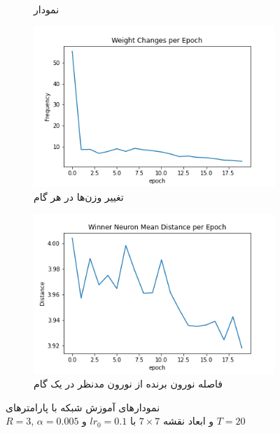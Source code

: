 \documentclass[12pt, a4paper]{article}
\begin{document}
\begin{figure}[h]
\begin{subfigure}{0.45\linewidth}
        \caption{نمودار }
    \end{subfigure}
    \newline
    \begin{subfigure}{0.45\linewidth}
        \includegraphics[width=\linewidth]{images/q5/r5/weight_change.png}
        \caption{تغییر وزن‌ها در هر گام}
    \end{subfigure}
    \hfill
    \begin{subfigure}{0.45\linewidth}
        \includegraphics[width=\linewidth]{images/q5/r5/winner_distance.png}
        \caption{فاصله نورون برنده از نورون مدنظر در یک گام}
    \end{subfigure}
    \caption{نمودار‌های آموزش شبکه  با پارامتر‌های \\$R=3$, $\alpha=0.005$ و ابعاد نقشه $7 \times 7$ با $lr_0=0.1$ و $T=20$}
    \label{r5}
\end{figure}
\end{document}
